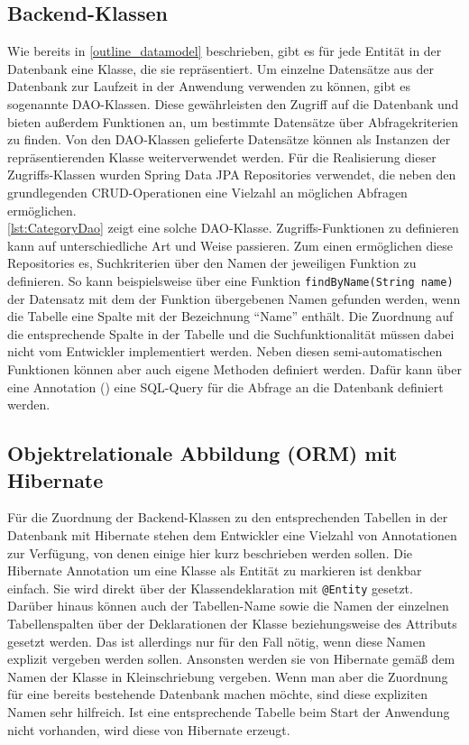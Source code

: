 \subsection{Backend-Klassen}
Wie bereits in \cref{outline_datamodel} beschrieben, gibt es für jede Entität in der Datenbank eine Klasse, die sie repräsentiert.
Um einzelne Datensätze aus der Datenbank zur Laufzeit in der Anwendung verwenden zu können, gibt es sogenannte \acs{DAO}-Klassen.
Diese gewährleisten den Zugriff auf die Datenbank und bieten außerdem Funktionen an, um bestimmte Datensätze über Abfragekriterien zu finden.
Von den \acs{DAO}-Klassen gelieferte Datensätze können als Instanzen der repräsentierenden Klasse weiterverwendet werden.
Für die Realisierung dieser Zugriffs-Klassen wurden Spring Data \acs{JPA} Repositories verwendet, die neben den grundlegenden \acs{CRUD}-Operationen eine Vielzahl an möglichen Abfragen ermöglichen.
\\


\cref{lst:CategoryDao} zeigt eine solche \acs{DAO}-Klasse.
Zugriffs-Funktionen zu definieren kann auf unterschiedliche Art und Weise passieren. Zum einen ermöglichen diese Repositories es, Suchkriterien über den Namen der jeweiligen Funktion zu definieren.
So kann beispielsweise über eine Funktion \texttt{findByName(String name)} der Datensatz mit dem der Funktion übergebenen Namen gefunden werden, wenn die Tabelle eine Spalte mit der Bezeichnung \enquote{Name} enthält.
Die Zuordnung auf die entsprechende Spalte in der Tabelle und die Suchfunktionalität müssen dabei nicht vom Entwickler implementiert werden.
Neben diesen semi-automatischen Funktionen können aber auch eigene Methoden definiert werden. Dafür kann über eine Annotation () eine \acs{SQL}-Query für die Abfrage an die Datenbank definiert werden.

\subsection{Objektrelationale Abbildung (\acs{ORM}) mit Hibernate}
Für die Zuordnung der Backend-Klassen zu den entsprechenden Tabellen in der Datenbank mit Hibernate stehen dem Entwickler eine Vielzahl von Annotationen zur Verfügung, von denen einige hier kurz beschrieben werden sollen.
Die Hibernate Annotation um eine Klasse als Entität zu markieren ist denkbar einfach. Sie wird direkt über der Klassendeklaration mit \texttt{@Entity} gesetzt.
Darüber hinaus können auch der Tabellen-Name sowie die Namen der einzelnen Tabellenspalten über der Deklarationen der Klasse beziehungsweise des Attributs gesetzt werden.
Das ist allerdings nur für den Fall nötig, wenn diese Namen explizit vergeben werden sollen. Ansonsten werden sie von Hibernate gemäß dem Namen der Klasse in Kleinschriebung vergeben.
Wenn man aber die Zuordnung für eine bereits bestehende Datenbank machen möchte, sind diese expliziten Namen sehr hilfreich.
Ist eine entsprechende Tabelle beim Start der Anwendung nicht vorhanden, wird diese von Hibernate erzeugt.

